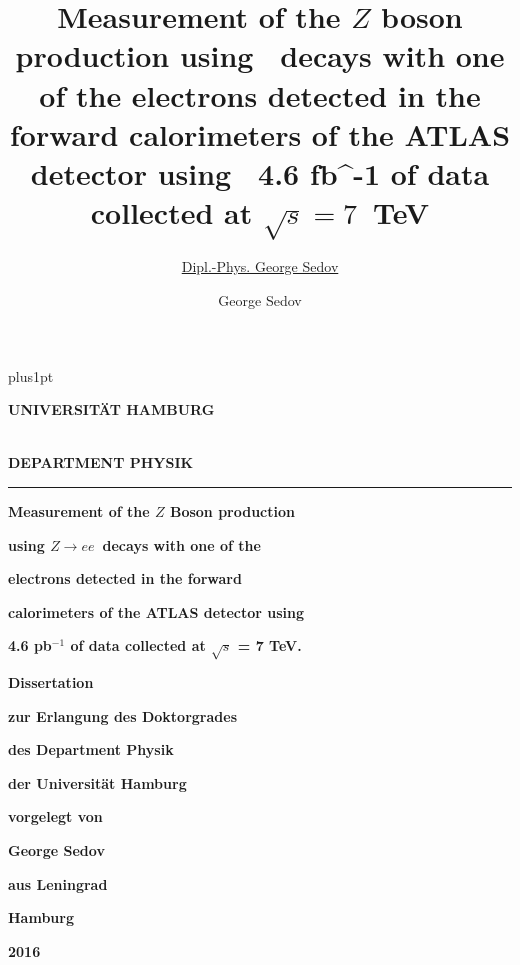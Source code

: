 \documentclass[oneside,11pt]{Classes/PhDthesisPSnPDF}
\title{Measurement of the $Z$ boson production using \Zee\ decays with one of the electrons
detected in the forward calorimeters of the ATLAS detector using  4.6 {fb}^{-1} of data
collected at $\sqrt{s} = 7$~TeV}
\author{\href{radist.morse@gmail.com}{Dipl.-Phys. George Sedov}}
\author{George Sedov}
\def\Zee{\ensuremath{Z \rightarrow ee}}
\begin{document}
\hypersetup{linktocpage}
%

\renewcommand\baselinestretch{1.2}
\baselineskip=16pt plus1pt


\begin{titlepage}
\vspace*{-1.6cm}
{\raggedright \large \bf \MakeUppercase{Universit\"{a}t Hamburg}} \\
{\large \bf \MakeUppercase{Department Physik} }\\
  \rule{\textwidth}{0.5pt}
    \vspace*{1.0cm}
	\begin{center}

	     {\huge\bf{Measurement of the $Z$ Boson production}\par}
           \vspace*{0.2cm}
	     {\huge\bf{using \Zee\ decays with one of the}\par}
           \vspace*{0.2cm}
	     {\huge\bf{electrons detected in the forward}\par}
           \vspace*{0.2cm}
	     {\huge\bf{calorimeters of the ATLAS detector using }\par}
           \vspace*{0.2cm}
	     {\huge\bf{4.6 pb$^{-1}$ of data collected at $\sqrt{s}$ = 7 TeV.}\par}

	        \vspace*{2.6cm}
        {\LARGE\bf Dissertation\par}
	        \vspace*{0.1cm}
	     {\LARGE\bf zur Erlangung des Doktorgrades\par }
	        \vspace*{0.1cm}
        {\LARGE\bf des Department Physik\par }
           \vspace*{0.1cm}
	     {\LARGE\bf der Universit\"{a}t Hamburg \par }
	        \vspace*{2.2cm}
        {\Large\bf vorgelegt von\par}
	        \vspace*{0.1cm}
        {\Large\bf George Sedov\par }
           \vspace{0.1cm}
	     {\Large\bf aus Leningrad \par }
	        \vspace*{2.2cm}
        {\Large\bf{Hamburg}\par}
	        \vspace*{0.1cm}
        {\Large\bf{2016}}
\end{center}
\end{titlepage}
\end{document}

